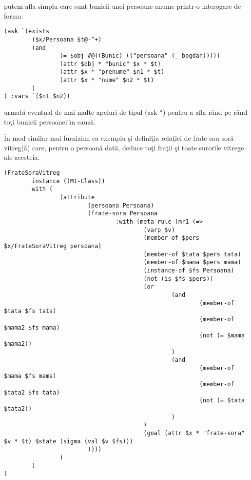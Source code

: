 \documentclass{article}
\begin{document}
putem afla simplu care sunt bunicii unei persoane anume printr-o interogare de forma:

{\scriptsize
\begin{verbatim}
(ask `(exists
        ($x/Persoana $t@-^+)
        (and
                (= $obj #@((Bunic) (("persoana" (_ bogdan)))))
                (attr $obj * "bunic" $x * $t)
                (attr $x * "prenume" $n1 * $t)
                (attr $x * "nume" $n2 * $t)
        )
) :vars `($n1 $n2))
\end{verbatim}
}

urmat\u{a} eventual de mai multe apeluri de tipul {\scriptsize (ask *)} pentru a afla r\^{a}nd
pe r\^{a}nd to\c{t}i bunicii persoanei \^{\i}n cauz\u{a}.

\^{I}n mod similar mai furniz\u{a}m ca exemplu \c{s}i defini\c{t}ia rela\c{t}iei de
frate sau sor\u{a} vitreg(\u{a}) care, pentru o persoan\u{a} dat\u{a}, deduce to\c{t}i
fra\c{t}ii \c{s}i toate surorile vitrege ale acesteia.

{\scriptsize
\begin{verbatim}
(FrateSoraVitreg
        instance ((M1-Class))
        with (
                (attribute
                        (persoana Persoana)
                        (frate-sora Persoana
                                :with (meta-rule (mr1 (=>
                                        (varp $v)
                                        (member-of $pers $x/FrateSoraVitreg persoana)
                                        (member-of $tata $pers tata)
                                        (member-of $mama $pers mama)
                                        (instance-of $fs Persoana)
                                        (not (is $fs $pers))
                                        (or
                                                (and                              
                                                        (member-of $tata $fs tata)
                                                        (member-of $mama2 $fs mama)
                                                        (not (= $mama $mama2))
                                                )
                                                (and
                                                        (member-of $mama $fs mama)
                                                        (member-of $tata2 $fs tata)
                                                        (not (= $tata $tata2))
                                                )
                                        )
                                        (goal (attr $x * "frate-sora" $v * $t) $state (sigma (val $v $fs)))
                        ))))
                )
        )
)
\end{verbatim}
}
\end{document}
